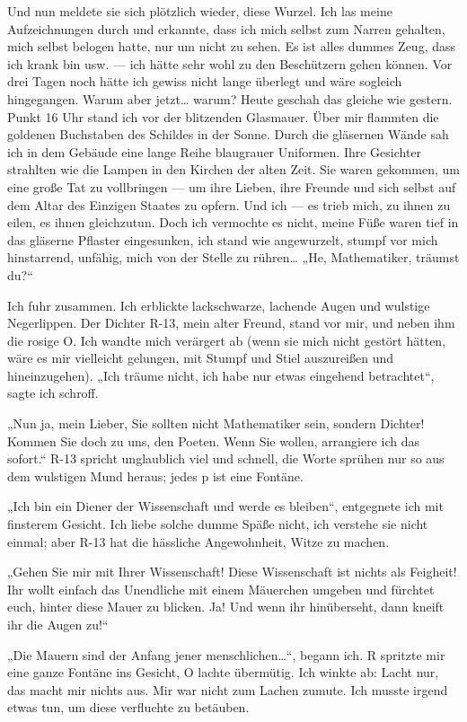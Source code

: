 Und nun meldete sie sich plötzlich wieder, diese Wurzel. Ich las
meine Aufzeichnungen durch und erkannte, dass ich mich selbst zum
Narren gehalten, mich selbst belogen hatte, nur um \wurzel{} nicht zu
sehen. Es ist alles dummes Zeug, dass ich krank bin usw. — ich
hätte sehr wohl zu den Beschützern gehen können. Vor drei Tagen
noch hätte ich gewiss nicht lange überlegt und wäre sogleich
hingegangen. Warum aber jetzt\ldots{} warum? Heute geschah das gleiche
wie gestern. Punkt 16 Uhr stand ich vor der blitzenden Glasmauer.
Über mir flammten die goldenen Buchstaben des Schildes in der
Sonne. Durch die gläsernen Wände sah ich in dem Gebäude eine lange
Reihe blaugrauer Uniformen. Ihre Gesichter strahlten wie die Lampen
in den Kirchen der alten Zeit. Sie waren gekommen, um eine große
Tat zu vollbringen — um ihre Lieben, ihre Freunde und sich selbst
auf dem Altar des Einzigen Staates zu opfern. Und ich — es trieb
mich, zu ihnen zu eilen, es ihnen gleichzutun. Doch ich vermochte
es nicht, meine Füße waren tief in das gläserne Pflaster
eingesunken, ich stand wie angewurzelt, stumpf vor mich
hinstarrend, unfähig, mich von der Stelle zu rühren\ldots{} „He,
Mathematiker, träumst du?“

Ich fuhr zusammen. Ich erblickte lackschwarze, lachende Augen und
wulstige Negerlippen. Der Dichter R-13, mein alter Freund, stand
vor mir, und neben ihm die rosige O. Ich wandte mich verärgert ab
(wenn sie mich nicht gestört hätten, wäre es mir vielleicht
gelungen, \wurzel{} mit Stumpf und Stiel auszureißen und hineinzugehen).
„Ich träume nicht, ich habe nur etwas eingehend betrachtet“, sagte
ich schroff.

„Nun ja, mein Lieber, Sie sollten nicht Mathematiker sein, sondern
Dichter! Kommen Sie doch zu uns, den Poeten. Wenn Sie wollen,
arrangiere ich das sofort.“ R-13 spricht unglaublich viel und
schnell, die Worte sprühen nur so aus dem wulstigen Mund heraus;
jedes p ist eine Fontäne.

„Ich bin ein Diener der Wissenschaft und werde es bleiben“,
entgegnete ich mit finsterem Gesicht. Ich liebe solche dumme Späße
nicht, ich verstehe sie nicht einmal; aber R-13 hat die hässliche
Angewohnheit, Witze zu machen.

„Gehen Sie mir mit Ihrer Wissenschaft! Diese Wissenschaft ist
nichts als Feigheit! Ihr wollt einfach das Unendliche mit einem
Mäuerchen umgeben und fürchtet euch, hinter diese Mauer zu blicken.
Ja! Und wenn ihr hinüberseht, dann kneift ihr die Augen zu!“

„Die Mauern sind der Anfang jener menschlichen\ldots{}“, begann ich. R
spritzte mir eine ganze Fontäne ins Gesicht, O lachte übermütig.
Ich winkte ab: Lacht nur, das macht mir nichts aus. Mir war nicht
zum Lachen zumute. Ich musste irgend etwas tun, um diese verfluchte
\wurzel{} zu betäuben.

